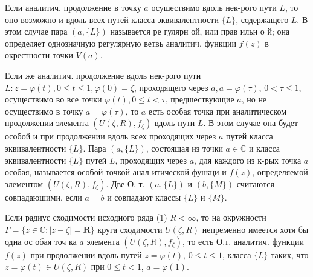 \documentclass[10pt]{article}
\begin{document}
Если аналитич. продолжение в точку $a$ осушествимо вдоль нек-рого пути $L$, то оно возможно и вдоль всех путей класса эквивалентности $\{L\}$, содержащего $L$. В этом случае пара $(a,\{L\})$ называется ре гулярн ой, или прав ильн о й; она определяет однозначную регулярную ветвь аналитич. функции $f(z)$ в окрестности точки $V(a)$.



Если же аналитич. продолжение вдоль нек-рого пути $L: z=\varphi(t), 0 \leqslant t \leqslant 1, \varphi(0)=\zeta$, проходящего через $a, a=\varphi(\tau)$, $0<\tau \leqslant 1$, осуществимо во все точки $\varphi(t), 0 \leqslant t<\tau$, предшествующие $a$, но не осуществимо в точку $a=\varphi(\tau)$, то $a$ есть особая точка при аналитическом продолжении элемента $\left(U(\zeta, R), f_{\zeta}\right)$ вдоль пути $L$. В этом случае она будет особой и при продолжении вдоль всех проходящих через $a$ путей класса эквивалентности $\{L\}$. Пара $(a,\{L\})$, состоящая из точки $a \in \overline{\mathbb{C}}$ и класса эквивалентности $\{L\}$ путей $L$, проходящих через $a$, для каждого из к-рых точка $a$ особая, называется особой точкой анал итической функци и $f(z)$, определяемой элементом $\left(U(\zeta, R), f_{\zeta}\right)$. Две О. т. $(a,\{L\})$ и $(b,\{M\})$ считаются совпадаюшими, если $a=b$ и совпадают классы $\{L\}$ и $\{M\}$.



Если радиус сходимости исходного ряда (1) $R<\infty$, то на окружности $\Gamma=\{z \in \overline{\mathbb{C}}:|z-\zeta|=\boldsymbol{R}\}$ круга сходимости $U(\zeta, R)$ непременно имеется хотя бы одна ос обая точ ка $a$ элемента $\left(U(\zeta, R), f_{\zeta}\right)$, то есть О.т. аналитич. функции $f(z)$ при продолжении вдоль путей $z=\varphi(t)$, $0 \leqslant t \leqslant 1$, класса $\{L\}$ таких, что $z=\varphi(t) \in U(\zeta, R)$ при $0 \leqslant t<1$, $a=\varphi(1)$.
\end{document}
